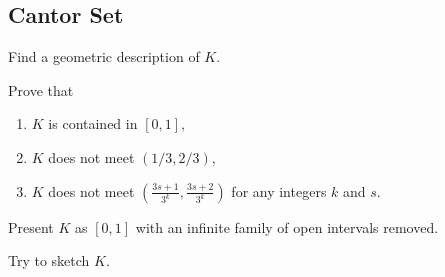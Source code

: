 \subsection{Cantor Set}

\begin{majorEx}
    Find a geometric description of $K$.

    Prove that
    \begin{enumerate}
        \item $K$ is contained in $[0,1]$,
        \item $K$ does not meet $(1/3, 2/3)$,
        \item $K$ does not meet $\left( \frac{3s+1}{3^k}, \frac{3s+2}{3^k}
            \right)$ for any integers $k$ and $s$.
    \end{enumerate}

    Present $K$ as $[0,1]$ with an infinite family of open intervals removed.

    Try to sketch $K$.
\end{majorEx}
